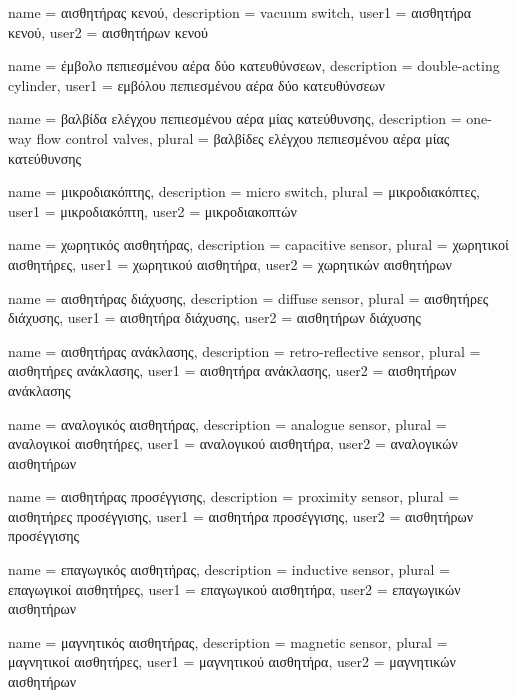 	{name			= {αισθητήρας κενού},
	 description	= {vacuum switch},
	 user1			= {αισθητήρα κενού},
	 user2			= {αισθητήρων κενού}
	}
	
	{name			= {έμβολο πεπιεσμένου αέρα δύο κατευθύνσεων},
	 description	= {double-acting cylinder},
	 user1			= {εμβόλου πεπιεσμένου αέρα δύο κατευθύνσεων}
	}

	{name			= {βαλβίδα ελέγχου πεπιεσμένου αέρα μίας κατεύθυνσης},
	 description	= {one-way flow control valves},
	 plural			= {βαλβίδες ελέγχου πεπιεσμένου αέρα μίας κατεύθυνσης}
	}
	
	{name			= {μικροδιακόπτης},
	 description	= {micro switch},
	 plural			= {μικροδιακόπτες},
	 user1			= {μικροδιακόπτη},
	 user2			= {μικροδιακοπτών}
	}
	
	{name			= {χωρητικός αισθητήρας},
	 description	= {capacitive sensor},
	 plural			= {χωρητικοί αισθητήρες},
	 user1			= {χωρητικού αισθητήρα},
	 user2			= {χωρητικών αισθητήρων}
	}
	
	{name			= {αισθητήρας διάχυσης},
	 description	= {diffuse sensor},
	 plural			= {αισθητήρες διάχυσης},
	 user1			= {αισθητήρα διάχυσης},
	 user2			= {αισθητήρων διάχυσης}
	}
	
	{name			= {αισθητήρας ανάκλασης},
	 description	= {retro-reflective sensor},
	 plural			= {αισθητήρες ανάκλασης},
	 user1			= {αισθητήρα ανάκλασης},
	 user2			= {αισθητήρων ανάκλασης}
	}
	
	{name			= {αναλογικός αισθητήρας},
	 description	= {analogue sensor},
	 plural			= {αναλογικοί αισθητήρες},
	 user1			= {αναλογικού αισθητήρα},
	 user2			= {αναλογικών αισθητήρων}
	}
	
	{name			= {αισθητήρας προσέγγισης},
	 description	= {proximity sensor},
	 plural			= {αισθητήρες προσέγγισης},
	 user1			= {αισθητήρα προσέγγισης},
	 user2			= {αισθητήρων προσέγγισης}
	}
	
	{name			= {επαγωγικός αισθητήρας},
	 description	= {inductive sensor},
	 plural			= {επαγωγικοί αισθητήρες},
	 user1			= {επαγωγικού αισθητήρα},
	 user2			= {επαγωγικών αισθητήρων}
	}
	
	{name			= {μαγνητικός αισθητήρας},
	 description	= {magnetic sensor},
	 plural			= {μαγνητικοί αισθητήρες},
	 user1			= {μαγνητικού αισθητήρα},
	 user2			= {μαγνητικών αισθητήρων}
	}
		
